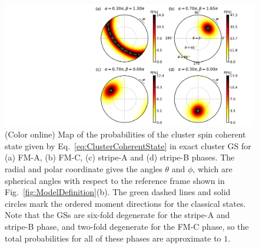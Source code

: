 \documentclass[aps,prb,reprint,amsfonts,amsmath,amssymb,showpacs,groupedaddress,superscriptaddress]{revtex4-1}
\begin{document}




\begin{figure}
    \centering
    \includegraphics[width=\columnwidth]{fig/Probabilities.pdf}
    \caption{\label{fig:Proabilities}(Color online) Map of the probabilities of the cluster spin coherent state given by Eq.~\eqref{eq:ClusterCoherentState} in exact cluster GS for (a) FM-A, (b) FM-C, (c) stripe-A and (d) stripe-B phases. The radial and polar coordinate gives the angles $\theta$ and $\phi$, which are spherical angles with respect to the reference frame shown in Fig.~\ref{fig:ModelDefinition}(b). The green dashed lines and solid circles mark the ordered moment directions for the classical states. Note that the GSs are six-fold degenerate for the stripe-A and stripe-B phase, and two-fold degenerate for the FM-C phase, so the total probabilities for all of these phases are approximate to $1$. }
\end{figure}
\end{document}
